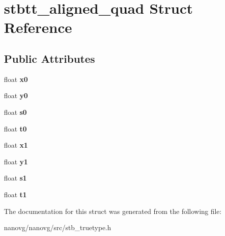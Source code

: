 \hypertarget{structstbtt__aligned__quad}{\section{stbtt\+\_\+aligned\+\_\+quad Struct Reference}
\label{structstbtt__aligned__quad}
}
\subsection*{Public Attributes}
\begin{DoxyCompactItemize}
\item 
\hypertarget{structstbtt__aligned__quad_ad74fd8fd69f8a8e1bd20cb0ab7df6e2e}{float {\bfseries x0}}\label{structstbtt__aligned__quad_ad74fd8fd69f8a8e1bd20cb0ab7df6e2e}

\item 
\hypertarget{structstbtt__aligned__quad_a6178a6b380cf6889893afaeb5019ecd6}{float {\bfseries y0}}\label{structstbtt__aligned__quad_a6178a6b380cf6889893afaeb5019ecd6}

\item 
\hypertarget{structstbtt__aligned__quad_ac23b153ff4042deb5499e5a8cacf4a59}{float {\bfseries s0}}\label{structstbtt__aligned__quad_ac23b153ff4042deb5499e5a8cacf4a59}

\item 
\hypertarget{structstbtt__aligned__quad_a921cd13638a8b3a1e0729021d371da49}{float {\bfseries t0}}\label{structstbtt__aligned__quad_a921cd13638a8b3a1e0729021d371da49}

\item 
\hypertarget{structstbtt__aligned__quad_a43a7eeac24238e289f825e644331dee6}{float {\bfseries x1}}\label{structstbtt__aligned__quad_a43a7eeac24238e289f825e644331dee6}

\item 
\hypertarget{structstbtt__aligned__quad_a66ee8061da982804073a3d2a9114e53c}{float {\bfseries y1}}\label{structstbtt__aligned__quad_a66ee8061da982804073a3d2a9114e53c}

\item 
\hypertarget{structstbtt__aligned__quad_a26360efee3cdfb5aa2bdc593157b436b}{float {\bfseries s1}}\label{structstbtt__aligned__quad_a26360efee3cdfb5aa2bdc593157b436b}

\item 
\hypertarget{structstbtt__aligned__quad_ae1f5ed7333ca5bba46c6a098a05ac75b}{float {\bfseries t1}}\label{structstbtt__aligned__quad_ae1f5ed7333ca5bba46c6a098a05ac75b}

\end{DoxyCompactItemize}


The documentation for this struct was generated from the following file\+:\begin{DoxyCompactItemize}
\item 
nanovg/nanovg/src/stb\+\_\+truetype.\+h\end{DoxyCompactItemize}
